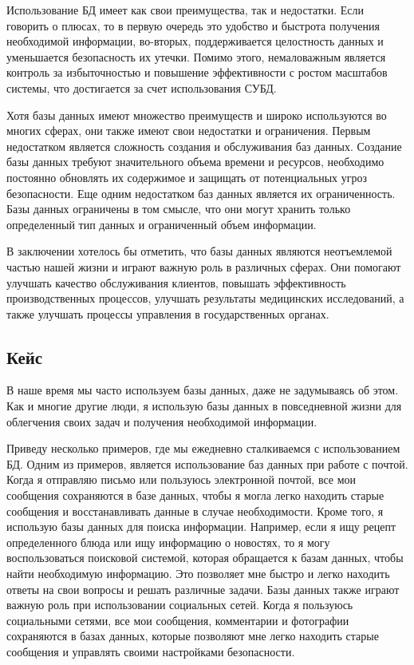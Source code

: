 \documentclass[14pt]{extreport}
\begin{document}
Использование БД имеет как свои преимущества, так и недостатки. Если говорить о плюсах, то в первую очередь это удобство и быстрота получения необходимой информации, во-вторых, поддерживается целостность данных и уменьшается безопасность их утечки. Помимо этого, немаловажным является контроль за избыточностью и повышение эффективности с ростом масштабов системы, что достигается за счет использования СУБД.

Хотя базы данных имеют множество преимуществ и широко используются во многих сферах, они также имеют свои недостатки и ограничения. Первым недостатком является сложность создания и обслуживания баз данных. Создание базы данных требуют значительного объема времени и ресурсов, необходимо постоянно обновлять их содержимое и защищать от потенциальных угроз безопасности. Еще одним недостатком баз данных является их ограниченность. Базы данных ограничены в том смысле, что они могут хранить только определенный тип данных и ограниченный объем информации.

В заключении хотелось бы отметить, что базы данных являются неотъемлемой частью нашей жизни и играют важную роль в различных сферах. Они помогают улучшать качество обслуживания клиентов, повышать эффективность производственных процессов, улучшать результаты медицинских исследований, а также улучшать процессы управления в государственных органах.

\subsection{Кейс}

В наше время мы часто используем базы данных, даже не задумываясь об этом. Как и многие другие люди, я использую базы данных в повседневной жизни для облегчения своих задач и получения необходимой информации.

Приведу несколько примеров, где мы ежедневно сталкиваемся с использованием БД. Одним из примеров, является использование баз данных при работе с почтой. Когда я отправляю письмо или пользуюсь электронной почтой, все мои сообщения сохраняются в базе данных, чтобы я могла легко находить старые сообщения и восстанавливать данные в случае необходимости. Кроме того, я использую базы данных для поиска информации. Например, если я ищу рецепт определенного блюда или ищу информацию о новостях, то я могу воспользоваться поисковой системой, которая обращается к базам данных, чтобы найти необходимую информацию. Это позволяет мне быстро и легко находить ответы на свои вопросы и решать различные задачи. Базы данных также играют важную роль при использовании социальных сетей. Когда я пользуюсь социальными сетями, все мои сообщения, комментарии и фотографии сохраняются в базах данных, которые позволяют мне легко находить старые сообщения и управлять своими настройками безопасности. 
\end{document}
